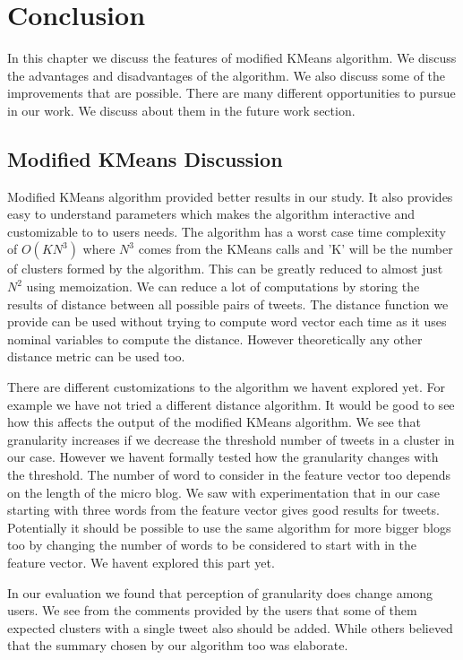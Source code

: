 \chapter{Conclusion}
\label{chap-six}

In this chapter we discuss the features of modified KMeans algorithm. We discuss the advantages and disadvantages of the algorithm. We also discuss some of the improvements that are possible. There are many different opportunities to pursue in our work. We discuss about them in the future work section.

\section{Modified KMeans Discussion}

Modified KMeans algorithm provided better results in our study. It also provides easy to understand parameters which makes the algorithm interactive and customizable to to users needs. The algorithm has a worst case time complexity of $O(KN^{3})$ where $N^{3}$ comes from the KMeans calls and 'K' will be the number of clusters formed by the algorithm. This can be greatly reduced to almost just $N^{2}$ using memoization. We can reduce a lot of computations by storing the results of distance between all possible pairs of tweets. The distance function we provide can be used without trying to compute word vector each time as it uses nominal variables to compute the distance. However theoretically any other distance metric can be used too.

There are different customizations to the algorithm we havent explored yet. For example we have not tried a different distance algorithm. It would be good to see how this affects the output of the modified KMeans algorithm. We see that granularity increases if we decrease the threshold number of tweets in a cluster in our case. However we havent formally tested how the granularity changes with the threshold. The number of word to consider in the feature vector too depends on the length of the micro blog. We saw with experimentation that in our case starting with three words from the feature vector gives good results for tweets. Potentially it should be possible to use the same algorithm for more bigger blogs  too by changing the number of words to be considered to start with in the feature vector. We havent explored this part yet. 

In our evaluation we found that perception of granularity does change among users. We see from the comments provided by the users that some of them expected clusters with a single tweet also should be added. While others believed that the summary chosen by our algorithm too was elaborate. 

